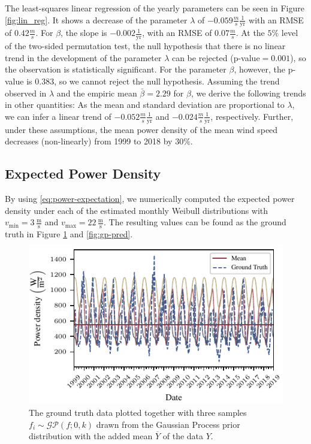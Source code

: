 \documentclass{article}
\theoremstyle{plain}
\theoremstyle{definition}
\theoremstyle{remark}
\begin{document}
The least-squares linear regression of the yearly parameters can be seen in Figure \ref{fig:lin_reg}.
It shows a decrease of the parameter $\lambda$ of 
$-0.059\frac{m}{s} \frac{1}{\mathrm{yr}}$ with an RMSE of $0.42\frac{m}{s}$. 
For $\beta$, the slope is $-0.002 \frac{1}{\mathrm{yr}}$, with an RMSE of $0.07  \frac{m}{s}$.
At the $5\%$ level of the two-sided permutation test, the null hypothesis that there is no linear trend in 
the development of the parameter $\lambda$ can be rejected (p-value$=0.001$), so the observation is statistically significant. 
For the parameter $\beta$, however, the p-value is $0.383$, so we cannot reject the null hypothesis.
Assuming the trend observed in $\lambda$ and the empiric mean $\bar \beta=2.29$ for $\beta$, we derive the following trends in other quantities:
As the mean  and standard deviation are proportional to $ \lambda$, we can infer a linear trend of $-0.052 \frac{m}{s}  \frac{1}{\mathrm{yr}}$
and  $-0.024 \frac{m}{s} \frac{1}{\mathrm{yr}}$, respectively. 
Further, under these assumptions, the mean power density 
of the mean wind speed decreases (non-linearly) from 1999 to 2018  by $30\%$. 

\subsection{Expected Power Density}

By using \eqref{eq:power-expectation}, we numerically computed the expected power density under each of the estimated monthly Weibull distributions with $v_\mathrm{min} = 3 \, \frac{\mathrm{m}}{\mathrm{s}}$ and $v_\mathrm{max} = 22 \, \frac{\mathrm{m}}{\mathrm{s}}$. The resulting values can be found as the ground truth in Figure \ref{fig:gp-samples} and \ref{fig:gp-pred}. 

\begin{figure}
    \centering
    \includegraphics{fig/gp_samples.pdf}
    \caption{The \textcolor{TUdarkblue}{ground truth} data plotted together with three samples $f_i \sim \mathcal{GP}(f; 0, k)$ drawn from the Gaussian Process prior distribution with the added \textcolor{TUred}{mean} $\overline{Y}$ of the data $Y$.}
    \label{fig:gp-samples}
\end{figure}
\end{document}
